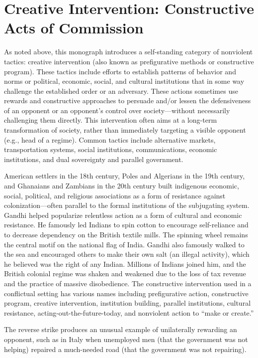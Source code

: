 \documentclass[twoside,a4paper,12pt,fleqn,openany]{extbook}
\begin{document}
\section*{Creative Intervention: Constructive Acts of Commission}

As noted above, this monograph introduces a self-standing category of nonviolent tactics: creative intervention (also known as prefigurative methods or constructive program). These tactics include efforts to establish patterns of behavior and norms or political, economic, social, and cultural institutions that in some way challenge the established order or an adversary. These actions sometimes use rewards and constructive approaches to persuade and/or lessen the defensiveness of an opponent or an opponent’s control over society—without necessarily challenging them directly. This intervention often aims at a long-term transformation of society, rather than immediately targeting a visible opponent (e.g., head of a regime). Common tactics include alternative markets, transportation systems, social institutions, communications, economic institutions, and dual sovereignty and parallel government.

American settlers in the 18th century, Poles and Algerians in the 19th century, and Ghanaians and Zambians in the 20th century built indigenous economic, social, political, and religious associations as a form of resistance against colonization—often parallel to the formal institutions of the subjugating system. Gandhi helped popularize relentless action as a form of cultural and economic resistance. He famously led Indians to spin cotton to encourage self-reliance and to decrease dependency on the British textile mills. The spinning wheel remains the central motif on the national flag of India. Gandhi also famously walked to the sea and encouraged others to make their own salt (an illegal activity), which he believed was the right of any Indian. Millions of Indians joined him, and the British colonial regime was shaken and weakened due to the loss of tax revenue and the practice of massive disobedience. The constructive intervention used in a conflictual setting has various names including prefigurative action, constructive program, creative intervention, institution building, parallel institutions, cultural resistance, acting-out-the-future-today, and nonviolent action to “make or create.”

The reverse strike produces an unusual example of unilaterally rewarding an opponent, such as in Italy when unemployed men (that the government was not helping) repaired a much-needed road (that the government was not repairing).
\end{document}
